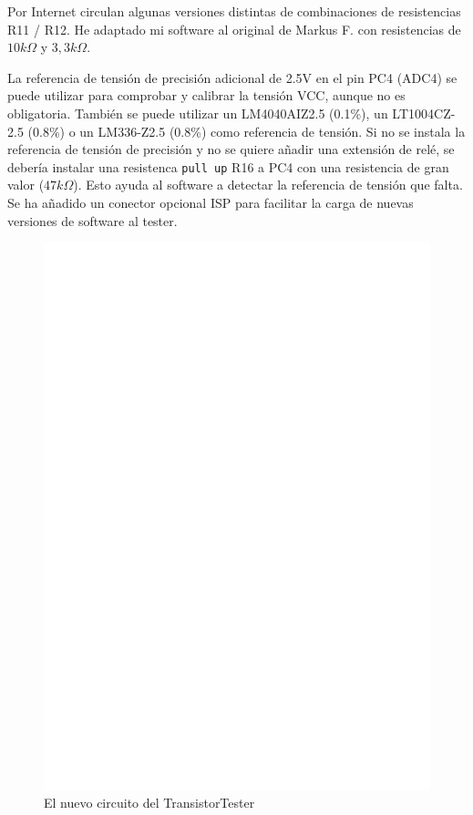 Por Internet circulan algunas versiones distintas de combinaciones de resistencias R11 / R12. He adaptado mi software al
original de Markus F. \cite{Frejek} con resistencias de \(10k\Omega\) y \(3,3k\Omega\).

La referencia  de tensión de  precisión adicional  de 2.5V en  el pin PC4  (ADC4) se  puede utilizar para  comprobar y
calibrar la tensión VCC, aunque no es obligatoria.  También se puede utilizar un LM4040AIZ2.5 (0.1\%), un LT1004CZ-2.5
(0.8\%) o un LM336-Z2.5 (0.8\%) como referencia de tensión. Si  no se instala la referencia de tensión de precisión y
no  se quiere  añadir una  extensión de relé,  se debería  instalar una  resistenca
\texttt{pull up}  R16 a PC4  con una resistencia  de gran valor  (\(47k\Omega\)). Esto ayuda  al software a  detectar la
referencia de tensión que falta. Se ha añadido un conector opcional ISP para facilitar la carga de nuevas versiones de
software al tester.

\begin{figure}[H]
\centering
\includegraphics[width=18cm]{../FIG/ttester.eps}
\caption{El nuevo circuito del TransistorTester}
\label{fig:ttester}
\end{figure}

